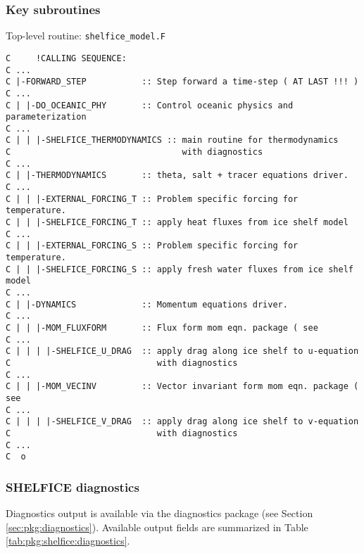 
\subsubsection{Key subroutines
\label{sec:pkg:shelfice:subroutines}}

Top-level routine: \texttt{shelfice\_model.F}

{\footnotesize
\begin{verbatim}
C     !CALLING SEQUENCE:
C ...
C |-FORWARD_STEP           :: Step forward a time-step ( AT LAST !!! )
C ...
C | |-DO_OCEANIC_PHY       :: Control oceanic physics and parameterization
C ...
C | | |-SHELFICE_THERMODYNAMICS :: main routine for thermodynamics
C                                  with diagnostics
C ...
C | |-THERMODYNAMICS       :: theta, salt + tracer equations driver.
C ...
C | | |-EXTERNAL_FORCING_T :: Problem specific forcing for temperature.
C | | |-SHELFICE_FORCING_T :: apply heat fluxes from ice shelf model
C ...
C | | |-EXTERNAL_FORCING_S :: Problem specific forcing for temperature.
C | | |-SHELFICE_FORCING_S :: apply fresh water fluxes from ice shelf model
C ...
C | |-DYNAMICS             :: Momentum equations driver.
C ...
C | | |-MOM_FLUXFORM       :: Flux form mom eqn. package ( see
C ...
C | | | |-SHELFICE_U_DRAG  :: apply drag along ice shelf to u-equation
C                             with diagnostics
C ...
C | | |-MOM_VECINV         :: Vector invariant form mom eqn. package ( see
C ...
C | | | |-SHELFICE_V_DRAG  :: apply drag along ice shelf to v-equation
C                             with diagnostics
C ...
C  o
\end{verbatim}
}



\subsubsection{SHELFICE diagnostics
\label{sec:pkg:shelfice:diagnostics}}

Diagnostics output is available via the diagnostics package
(see Section \ref{sec:pkg:diagnostics}).
Available output fields are summarized in 
Table \ref{tab:pkg:shelfice:diagnostics}.

